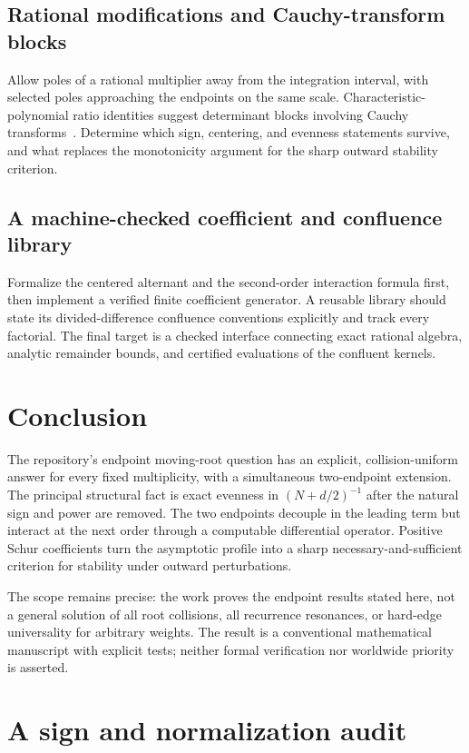\documentclass[11pt,a4paper]{article}
\numberwithin{equation}{section}
\theoremstyle{definition}
\theoremstyle{remark}
\begin{document}
\subsection{Rational modifications and Cauchy-transform blocks}
Allow poles of a rational multiplier away from the integration interval,
with selected poles approaching the endpoints on the same scale.
Characteristic-polynomial ratio identities suggest determinant blocks
involving Cauchy transforms~\cite{StrahovFyodorov2003,AkemannFyodorov2003}. Determine which sign, centering,
and evenness statements survive, and what replaces the monotonicity
argument for the sharp outward stability criterion.

\subsection{A machine-checked coefficient and confluence library}
Formalize the centered alternant and the second-order interaction formula
first, then implement a verified finite coefficient generator. A reusable
library should state its divided-difference confluence conventions
explicitly and track every factorial. The final target is a checked
interface connecting exact rational algebra, analytic remainder bounds,
and certified evaluations of the confluent kernels.

\section{Conclusion}\label{tec:sec:conclusion}
The repository's endpoint moving-root question has an explicit,
collision-uniform answer for every fixed multiplicity, with a simultaneous
two-endpoint extension. The principal structural fact is exact evenness
in $(N+d/2)^{-1}$ after the natural sign and power are removed.
The two endpoints decouple in the leading term but interact at the next
order through a computable differential operator. Positive Schur
coefficients turn the asymptotic profile into a sharp necessary-and-sufficient
criterion for stability under outward perturbations.

The scope remains precise: the work proves the endpoint results stated
here, not a general solution of all root collisions, all recurrence
resonances, or hard-edge universality for arbitrary weights. The result
is a conventional mathematical manuscript with explicit tests; neither
formal verification nor worldwide priority is asserted.

\section{A sign and normalization audit}\label{tec:app:audit}
\end{document}
